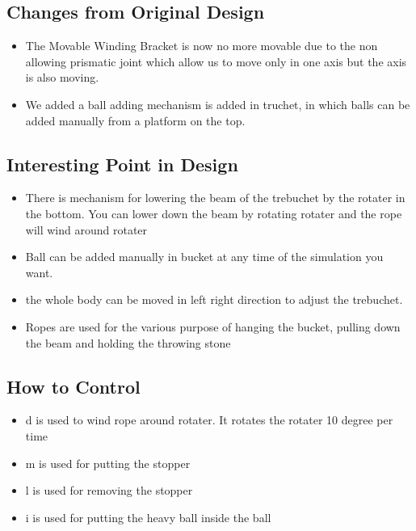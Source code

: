 \documentclass[11pt]{article}
\begin{document}
\subsection{Changes from Original Design}
\begin{itemize}
\item The Movable Winding Bracket is now no more movable due to the non allowing prismatic joint which allow us to move only in one axis but the axis is also moving.
\item We added a ball adding mechanism is added in truchet, in which balls can be added manually from a platform on the top.
\end{itemize}

\subsection{Interesting Point in Design}
\begin{itemize}
\item There is mechanism for lowering the beam of the trebuchet by the rotater in the bottom. You can lower down the beam by rotating rotater and the rope will wind around rotater
\item Ball can be added manually in bucket at any time of the simulation you want.
\item the whole body can be moved in left right direction to adjust the trebuchet.
\item Ropes are used for the various purpose of hanging the bucket, pulling down the beam and holding the throwing stone

\end{itemize}
\subsection{How to Control}
\begin{itemize}
\item d is used to wind rope around rotater. It rotates the rotater 10 degree per time
\item m is used for putting the stopper 
\item l is used for removing the stopper
\item i is used for putting the heavy ball inside the ball


\end{itemize}
\end{document}
